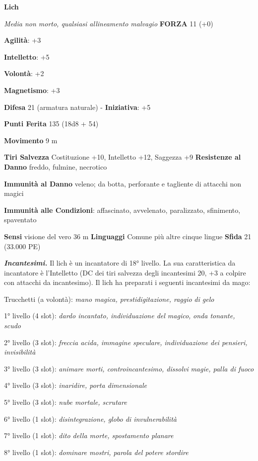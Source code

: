 \begin{multicols}{2}
\textbf{Lich}

\emph{Media non morto, qualsiasi allineamento malvagio} \textbf{FORZA}
11 (+0)

\textbf{Agilità}: +3

\textbf{Intelletto}: +5

\textbf{Volontà}: +2

\textbf{Magnetismo}: +3

\textbf{Difesa} 21 (armatura naturale) - \textbf{Iniziativa}: +5

\textbf{Punti Ferita} 135 (18d8 + 54)

\textbf{Movimento} 9 m

\textbf{Tiri Salvezza} Costituzione +10, Intelletto +12, Saggezza +9
\textbf{Resistenze al Danno} freddo, fulmine, necrotico

\textbf{Immunità al Danno} veleno; da botta, perforante e tagliente
di attacchi non magici

\textbf{Immunità alle Condizioni}: affascinato, avvelenato, paralizzato,
sfinimento, spaventato

\textbf{Sensi} visione del vero 36 m
\textbf{Linguaggi} Comune più altre cinque lingue \textbf{Sfida} 21
(33.000 PE)\smallskip

\emph{\textbf{Incantesimi.}} Il lich è un incantatore di 18° livello. La
sua caratteristica da incantatore è l'Intelletto (DC dei tiri salvezza
degli incantesimi 20, +3 a colpire con attacchi da incantesimo). Il lich
ha preparati i seguenti incantesimi da mago:

Trucchetti (a volontà): \emph{mano magica, prestidigitazione, raggio}
\emph{di gelo}

1° livello (4 slot): \emph{dardo incantato, individuazione del magico,}
\emph{onda tonante, scudo}

2° livello (3 slot): \emph{freccia acida, immagine speculare,}
\emph{individuazione dei pensieri, invisibilità}

3° livello (3 slot): \emph{animare morti, controincantesimo, dissolvi}
\emph{magie, palla di fuoco}

4° livello (3 slot): \emph{inaridire, porta dimensionale}

5° livello (3 slot): \emph{nube mortale, scrutare}

6° livello (1 slot): \emph{disintegrazione, globo di invulnerabilità}

7° livello (1 slot): \emph{dito della morte, spostamento planare}

8° livello (1 slot): \emph{dominare mostri, parola del potere stordire}


\end{multicols}
